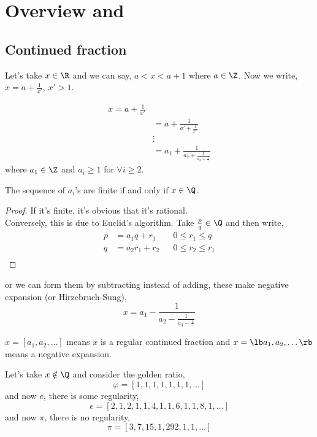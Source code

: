 \documentclass{article}
\begin{document}
  \maketitle

\section{Overview and }
\subsection{Continued fraction}
Let's take $x \in \R$ and we can say, $a < x < a + 1$ where $a \in \Z$. Now we write, $x = a + \frac{1}{x'}$, $x' > 1$.

\begin{align*}
  x = a + \frac{1}{x'} \\
  &= a + \frac{1}{a' + \frac{1}{x''}}\\
  &\vdots\\
  &= a_1 + \frac{1}{a_2 + \frac{1}{a_3 + \frac{1}{\ddots}}}
\end{align*}
where $a_1 \in \Z$ and $a_i \ge 1$ for $\forall i \ge 2$. \\

\begin{nlemma}
  The sequence of $a_i$'s are finite if and only if $x \in \Q$.
\end{nlemma}
\begin{proof}
  If it's finite, it's obvious that it's rational.\\
  Conversely, this is due to Euclid's algorithm. Take $\frac{p}{q} \in \Q$ and then write,
  \begin{align*}
    p &= a_1q + r_1 && 0 \le r_1 \le q\\
    q &= a_2r_1 + r_2 && 0 \le r_2 \le r_1\\
  \end{align*}
\end{proof}
or we can form them by subtracting instead of adding, these make negative expansion (or Hirzebruch-Sung),
$$ x = a_1 - \frac{1}{a_2 - \frac{1}{a_3 - \frac{1}{\ddots}}} $$

\begin{notation}
 $x = [a_1, a_2, \dots]$ means $x$ is a regular continued fraction and $x = \lb a_1, a_2, \dots\rb $ means a negative expansion.
\end{notation}

  Let's take $x \notin \Q$ and consider the golden ratio,\\
  $$ \varphi = [1, 1, 1, 1, 1, 1, 1, \dots] $$
  and now $e$, there is some regularity,
  $$ e = [2, 1, 2, 1, 1, 4, 1, 1, 6, 1, 1, 8, 1, \dots] $$
  and now $\pi$, there is no regularity,
  $$ \pi = [3, 7, 15, 1, 292, 1, 1, \dots] $$
\end{document}
